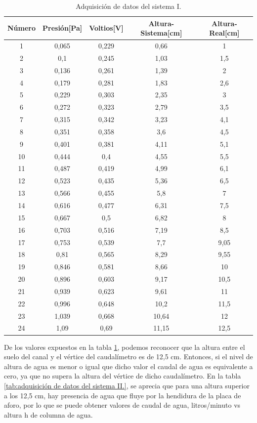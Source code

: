 \begin{table}[htpb]
	\centering
	\caption[Adquisición de datos del sistema I]{Adquisición de datos del sistema I.}
	\begin{tabular}{c c c c c}    
		\toprule
		\textbf{Número}   & \textbf{Presión[Pa]}  & \textbf{Voltios[V]} & \textbf{Altura-Sistema[cm]} & \textbf{Altura-Real[cm]} \\
		\midrule
		1  & 0,065 & 0,229  & 0,66  & 1 \\
		2  & 0,1   & 0,245  & 1,03  & 1,5 \\
		3  & 0,136 & 0,261  & 1,39  & 2 \\
		4  & 0,179 & 0,281  & 1,83  & 2,6 \\
		5  & 0,229 & 0,303	& 2,35  & 3  \\
		6  & 0,272 & 0,323  & 2,79  & 3,5 \\
		7  & 0,315 & 0,342	& 3,23  & 4,1 \\
		8  & 0,351 & 0,358	& 3,6   & 4,5   \\
		9  & 0,401 & 0,381	& 4,11	& 5,1 \\
		10 & 0,444 & 0,4	& 4,55	& 5,5 \\
		11 & 0,487 & 0,419	& 4,99	& 6,1 \\
		12 & 0,523 & 0,435	& 5,36	& 6,5 \\
		13 & 0,566 & 0,455	& 5,8	& 7 \\
		14 & 0,616 & 0,477	& 6,31	& 7,5 \\
		15 & 0,667 & 0,5	& 6,82	& 8 \\
		16 & 0,703 & 0,516	& 7,19	& 8,5 \\
		17 & 0,753 & 0,539	& 7,7	& 9,05 \\
		18 & 0,81  & 0,565	& 8,29	& 9,55 \\
		19 & 0,846 & 0,581	& 8,66	& 10 \\
		20 & 0,896 & 0,603	& 9,17	& 10,5 \\
		21 & 0,939 & 0,623	& 9,61	& 11 \\
		22 & 0,996 & 0,648	& 10,2	& 11,5 \\
		23 & 1,039 & 0,668	& 10,64	& 12\\
		24 & 1,09  & 0,69	& 11,15	& 12,5 \\

	
		\bottomrule
		\hline
	\end{tabular}
	\label{tab:adquisición de datos del sistema I.}
\end{table}

De los valores expuestos en la tabla \ref{tab:adquisición de datos del sistema I.}, podemos reconocer que la altura entre el suelo del canal y el vértice del caudalímetro es de 12,5 cm. Entonces, si el nivel de altura de agua es menor o igual que dicho valor el caudal de agua es equivalente a cero, ya que no supera la altura del vértice de dicho caudalímetro.
En la tabla \ref{tab:adquisición de datos del sistema II.}, se aprecia que para una altura superior a los 12,5 cm, hay presencia de agua que fluye por la hendidura de la placa de aforo, por lo que se puede obtener valores de caudal de agua, litros/minuto vs altura h de columna de agua.
 
